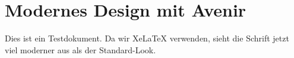 \documentclass[12pt, a4paper]{article}
\begin{document}
	
	\section*{Modernes Design mit Avenir}
	Dies ist ein Testdokument. Da wir XeLaTeX verwenden, sieht die Schrift jetzt viel moderner aus als der Standard-Look. 
	
\end{document}
